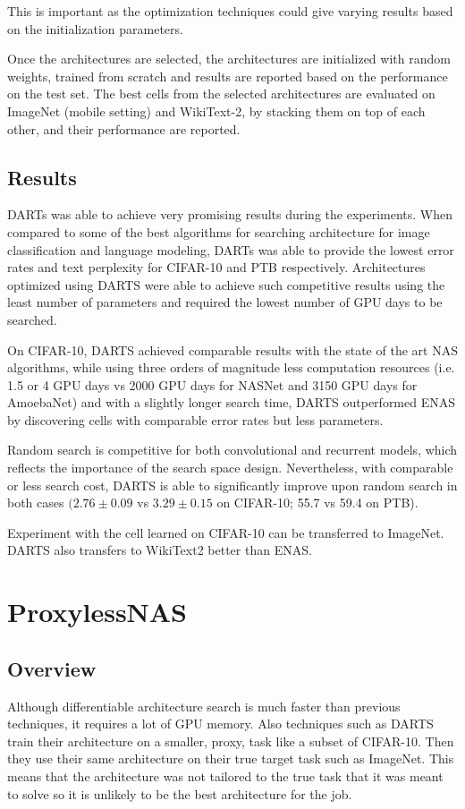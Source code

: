 \documentclass{ieee}
\begin{document}
This is important as the optimization techniques could give varying results based on the initialization parameters.

Once the architectures are selected, the architectures are initialized with random weights, trained from scratch and results are reported based on the performance on the test set.
The best cells from the selected architectures are evaluated on ImageNet (mobile setting) and WikiText-2, by stacking them on top of each other, and their performance are reported.


\subsection{Results}
DARTs was able to achieve very promising results during the experiments. When compared to some of the best algorithms for searching architecture for  image classification and language modeling, DARTs was able to provide the lowest error rates and text perplexity for CIFAR-10 and PTB respectively. Architectures optimized using DARTS were able to achieve such competitive results using the least number of parameters and required the lowest number of GPU days to be searched.

On CIFAR-10, DARTS achieved comparable results with the state of the art NAS algorithms, while using three orders of magnitude less computation resources (i.e. 1.5 or 4 GPU days vs 2000 GPU days for NASNet and 3150 GPU days for AmoebaNet) and with a slightly longer search time, DARTS outperformed ENAS by discovering cells with comparable error rates but less parameters.

Random search is competitive for both convolutional and recurrent models, which reflects the importance of the search space design. Nevertheless, with comparable or less search cost, DARTS is able to significantly improve upon random search in both cases $(2.76 \pm 0.09$ vs $3.29 \pm 0.15$ on CIFAR-10; 55.7 vs 59.4 on PTB).

Experiment with the cell learned on CIFAR-10 can be transferred to ImageNet. DARTS also transfers to WikiText2 better than ENAS.

\section{ProxylessNAS}
\subsection{Overview}
Although differentiable architecture search is much faster than previous techniques, it requires a lot of GPU memory. Also techniques such as DARTS train their architecture on a smaller, proxy, task like a subset of CIFAR-10. Then they use their same architecture on their true target task such as ImageNet. This means that the architecture was not tailored to the true task that it was meant to solve so it is unlikely to be the best architecture for the job.
\end{document}
